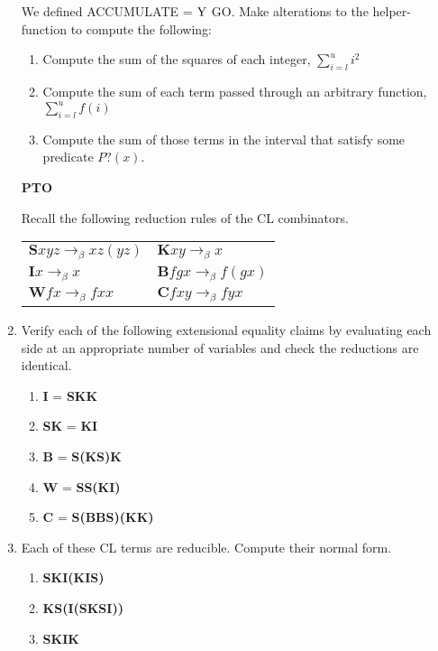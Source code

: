 \documentclass[11pt]{report}
\begin{document}
\begin{enumerate}
	 We defined ACCUMULATE = $\text{Y}$ GO. Make alterations to the helper-function to compute the following: 
	
	 \begin{enumerate}
	 	\item Compute the sum of the squares of each integer, $\sum_{i=l}^u i^{2}$
	 	\item Compute the sum of each term passed through an arbitrary function, $\sum_{i=l}^u f(i)$
	 	\item Compute the sum of those terms in the interval that satisfy some predicate $P?(x)$.
	 \end{enumerate}
	 
	 \vfill
	 \hfill \textbf{PTO}



\newpage

Recall the following reduction rules of the CL combinators. 

\begin{tabular}{l l}
$\textbf{S}xyz \to_{\beta} xz(yz)$ & $\textbf{K}xy \to_{\beta} x$ \\
$\textbf{I}x \to_{\beta} x$ & $\textbf{B}fgx \to_{\beta}f(gx)$ \\
$\textbf{W}fx \to_{\beta}fxx$ & $\textbf{C}fxy \to_{\beta} fyx$
\end{tabular}

\item Verify each of the following extensional equality claims by evaluating each side at an appropriate number of variables and check the reductions are identical.

	\begin{enumerate}
		\item \textbf{I} = \textbf{SKK}
		\item \textbf{SK} = \textbf{KI}
		\item \textbf{B} = \textbf{S(KS)K}
		\item \textbf{W} = \textbf{SS(KI)}
		\item \textbf{C} = \textbf{S(BBS)(KK)}	
	\end{enumerate}

\item Each of these CL terms are reducible. Compute their normal form.

	\begin{enumerate}
		\item \textbf{SKI(KIS)}
		\item \textbf{KS(I(SKSI))}
		\item \textbf{SKIK}	
	\end{enumerate}


\end{enumerate}
\end{document}
